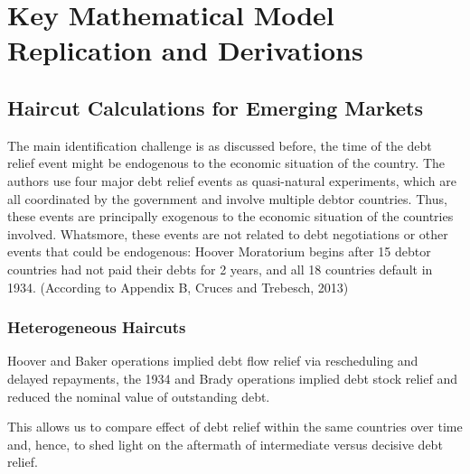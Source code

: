 \chapter{Key Mathematical Model Replication and Derivations}
\label{chapter:mathmodel}

\section{Haircut Calculations for Emerging Markets}


\cite{borusyak2021revisiting}
\cite{callaway2021difference}
\cite{cruces2013sovereign}
\cite{goodman-bacon2021difference}
\cite{reinhart2016sovereign}
\cite{sun2021estimating}
\cite{sturzenegger2006debt}
The main identification challenge is as discussed before, the time of the debt relief event might be endogenous to the economic situation of the country. 
The authors use four major debt relief events as quasi-natural experiments, which are all coordinated by the government and involve multiple debtor countries.
Thus, these events are principally exogenous to the economic situation of the countries involved.
Whatsmore, these events are not related to debt negotiations or other events that could be endogenous: Hoover Moratorium begins after 15 debtor countries had not paid their debts for 2 years, and all 18 countries default in 1934.
(According to Appendix B, Cruces and Trebesch, 2013)

\subsection{Heterogeneous Haircuts}
Hoover and Baker operations implied debt flow relief via rescheduling and delayed
repayments, the 1934 and Brady operations implied debt stock relief and reduced
the nominal value of outstanding debt.

This allows us to compare effect of debt relief within the same countries over time and, hence, to shed light on
the aftermath of intermediate versus decisive debt relief.

